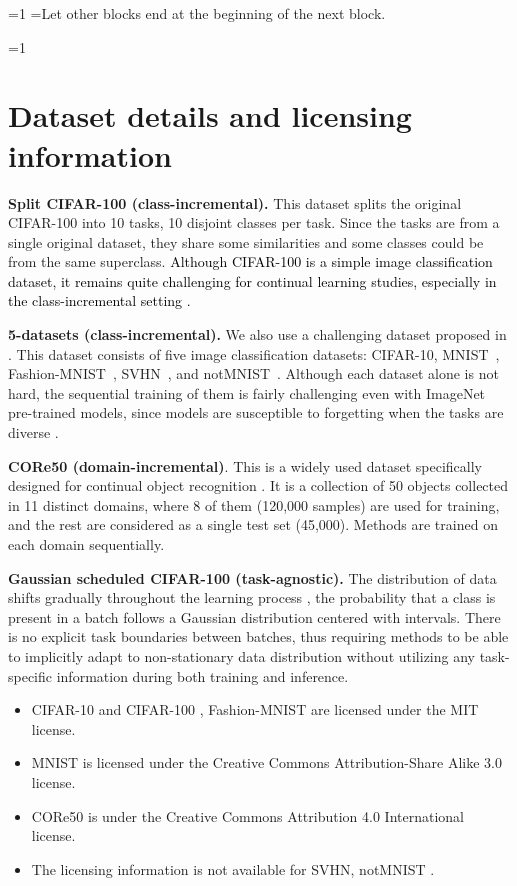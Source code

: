 \documentclass[10pt,twocolumn,letterpaper]{article}
\newcommand{\zizhaoz}[1]{\textcolor{black}{#1}}
\newcounter{alphasect}
\def\alphainsection{0}
\let\oldsection=\section
\def\section{%
  \ifnum\alphainsection=1%
    \addtocounter{alphasect}{1}
  \fi%
\oldsection}%
\newenvironment{alphasection}{%
  \ifnum\alphainsection=1%
    \errhelp={Let other blocks end at the beginning of the next block.}
    \errmessage{Nested Alpha section not allowed}
  \fi%
  \setcounter{alphasect}{0}
  \def\alphainsection{1}
}{%
  \setcounter{alphasect}{0}
  \def\alphainsection{0}
}%
\begin{document}
\begin{alphasection}
\section{Dataset details and licensing information} \label{appendix:dataset}
\textbf{Split CIFAR-100 (class-incremental).} This dataset splits the original CIFAR-100 \cite{krizhevsky2009learning} into 10 tasks, 10 disjoint classes per task. Since the tasks are from a single original dataset, they share some similarities and some classes could be from the same superclass. 
\zizhaoz{Although CIFAR-100 is a simple image classification dataset, it remains quite challenging for continual learning studies, especially in the class-incremental setting \cite{mai2021online}.}


\textbf{5-datasets (class-incremental).} We also use a challenging dataset proposed in \cite{ebrahimi2020adversarial}. This dataset consists of five image classification datasets: CIFAR-10, MNIST~\cite{lecun1998mnist}, Fashion-MNIST~\cite{xiao2017fashion}, SVHN~\cite{netzer2011reading}, and notMNIST~\cite{notmnist}. Although each dataset alone is not hard, the sequential training of them is fairly challenging even with ImageNet pre-trained models, since models are susceptible to forgetting when the tasks are diverse \cite{mehtaempirical}. 


\textbf{CORe50 (domain-incremental)}. 
This is a widely used dataset specifically designed for continual object recognition \cite{lomonaco2017core50}. 
It is a collection of 50 objects collected in 11 distinct domains, where 8 of them (120,000 samples) are used for training, and the rest are considered as a single test set (45,000). %
Methods are trained on each domain sequentially.

\textbf{Gaussian scheduled CIFAR-100 (task-agnostic).} 
The distribution of data shifts gradually throughout the learning process \cite{shanahan2021encoders}, the probability that a class is present in a batch follows a Gaussian distribution centered with intervals. There is no explicit task boundaries between batches, thus requiring methods to be able to implicitly adapt to non-stationary data distribution without utilizing any task-specific information during both training and inference.

\begin{itemize}
    \item CIFAR-10 and CIFAR-100 \cite{krizhevsky2009learning}, Fashion-MNIST \cite{xiao2017fashion} are licensed under the MIT license.
    \item MNIST \cite{lecun1998mnist} is licensed under the Creative Commons Attribution-Share Alike 3.0 license.
    \item CORe50 \cite{lomonaco2017core50} is under the Creative Commons Attribution 4.0 International license.
    \item The licensing information is not available for SVHN\cite{netzer2011reading}, notMNIST \cite{notmnist}.
\end{itemize}



\end{alphasection}
\end{document}
